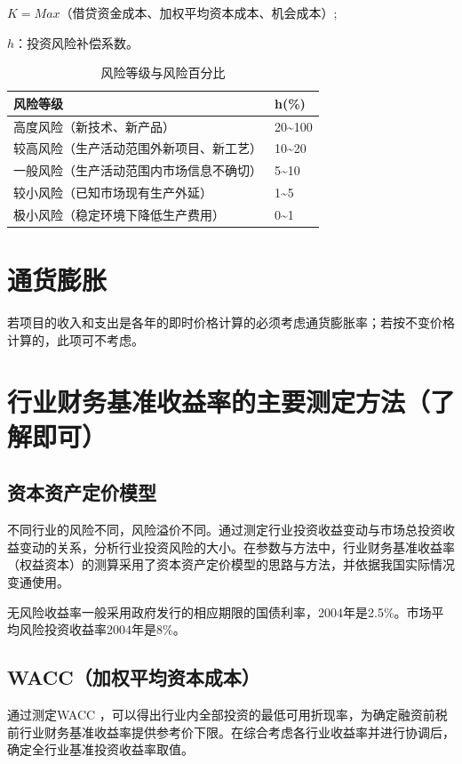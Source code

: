 $K=Max$（借贷资金成本、加权平均资本成本、机会成本）;

$h$：投资风险补偿系数。

\begin{table}[H]
\centering
\begin{tabular}{|l|l|}
\hline
\textbf{风险等级}       & \textbf{h(\%)}                \\ \hline
高度风险（新技术、新产品）      & 20\textasciitilde100        \\ \hline
较高风险（生产活动范围外新项目、新工艺） & 10\textasciitilde20         \\ \hline
一般风险（生产活动范围内市场信息不确切） & 5\textasciitilde10          \\ \hline
较小风险（已知市场现有生产外延）   & 1\textasciitilde5           \\ \hline
极小风险（稳定环境下降低生产费用）   & 0\textasciitilde1           \\ \hline
\end{tabular}
\caption{风险等级与风险百分比}
\end{table}

\section{通货膨胀}
若项目的收入和支出是各年的即时价格计算的必须考虑通货膨胀率；若按不变价格计算的，此项可不考虑。

\section{行业财务基准收益率的主要测定方法（了解即可）}
\subsection{资本资产定价模型}
不同行业的风险不同，风险溢价不同。通过测定行业投资收益变动与市场总投资收益变动的关系，分析行业投资风险的大小。在参数与方法中，行业财务基准收益率（权益资本）的测算采用了资本资产定价模型的思路与方法，并依据我国实际情况变通使用。

无风险收益率一般采用政府发行的相应期限的国债利率，2004年是2.5\%。市场平均风险投资收益率2004年是8\%。

\subsection{WACC（加权平均资本成本）}
通过测定WACC ，可以得出行业内全部投资的最低可用折现率，为确定融资前税前行业财务基准收益率提供参考价下限。在综合考虑各行业收益率并进行协调后，确定全行业基准投资收益率取值。


